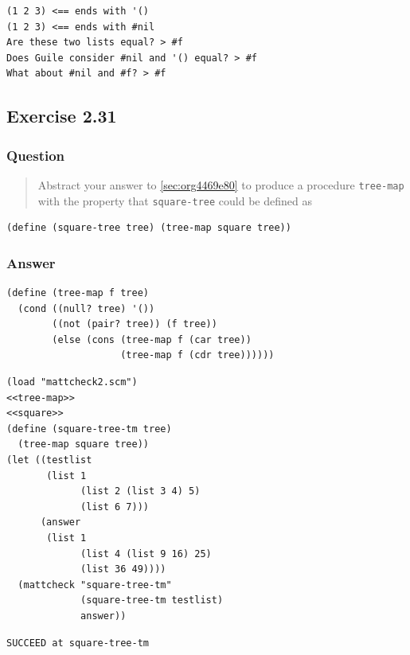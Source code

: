\documentclass[final,fleqn,titlepage,twoside]{article}
\begin{document}
\begin{verbatim}
(1 2 3) <== ends with '()
(1 2 3) <== ends with #nil
Are these two lists equal? > #f
Does Guile consider #nil and '() equal? > #f
What about #nil and #f? > #f
\end{verbatim}

\subsection{Exercise 2.31}
\label{sec:orgb50ca73}
\subsubsection{Question}
\label{sec:orgd6dfde4}
\begin{quote}
Abstract your answer to \ref{sec:org4469e80} to produce a procedure
\texttt{tree-map} with the property that \texttt{square-tree} could be
defined as
\end{quote}

\begin{verbatim}
(define (square-tree tree) (tree-map square tree))
\end{verbatim}

\subsubsection{Answer}
\label{sec:org72d5d3e}
\begin{verbatim}
(define (tree-map f tree)
  (cond ((null? tree) '())
        ((not (pair? tree)) (f tree))
        (else (cons (tree-map f (car tree))
                    (tree-map f (cdr tree))))))
\end{verbatim}
\begin{verbatim}
(load "mattcheck2.scm")
<<tree-map>>
<<square>>
(define (square-tree-tm tree)
  (tree-map square tree))
(let ((testlist
       (list 1
             (list 2 (list 3 4) 5)
             (list 6 7)))
      (answer
       (list 1
             (list 4 (list 9 16) 25)
             (list 36 49))))
  (mattcheck "square-tree-tm"
             (square-tree-tm testlist)
             answer))
\end{verbatim}

\begin{verbatim}
SUCCEED at square-tree-tm
\end{verbatim}
\end{document}
